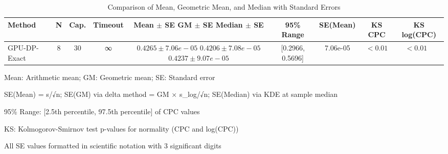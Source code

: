\begin{table*}[htbp]
\centering
\caption{Comparison of Mean, Geometric Mean, and Median with Standard Errors}
\label{tab:central-tendency-comparison}
\begin{tabular}{@{}l c c c c c c c c@{}}
\toprule
\textbf{Method} & \textbf{N} & \textbf{Cap.} & \textbf{Timeout} & \textbf{Mean $\pm$ SE GM $\pm$ SE Median $\pm$ SE} & \textbf{95\% Range} & \textbf{SE(Mean)} & \textbf{KS CPC} & \textbf{KS log(CPC)} \\
\midrule
GPU-DP-Exact & 8 & 30 & ∞ & $0.4265 \pm 7.06e-05$ $0.4206 \pm 7.08e-05$ $0.4237 \pm 9.07e-05$ & [0.2966, 0.5696] & 7.06e-05 & $<0.01$ & $<0.01$ \
\bottomrule
\end{tabular}
\begin{tablenotes}
\small
\item Mean: Arithmetic mean; GM: Geometric mean; SE: Standard error
\item SE(Mean) = s/√n; SE(GM) via delta method = GM × s_log/√n; SE(Median) via KDE at sample median
\item 95\% Range: [2.5th percentile, 97.5th percentile] of CPC values
\item KS: Kolmogorov-Smirnov test p-values for normality (CPC and log(CPC))
\item All SE values formatted in scientific notation with 3 significant digits
\end{tablenotes}
\end{table*}
